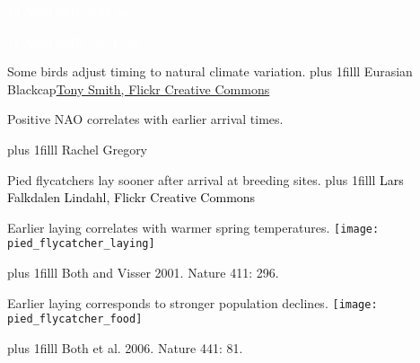 \documentclass[t]{beamer}
\newcommand\imagecredit[1]{%
	\vskip0pt plus 1filll \tiny #1}%
\begin{document}
{
\begin{frame}[t,plain]{\textcolor{white}{10 April 2015, 3:11 am.}}
\end{frame}
}

{
\begin{frame}[t,plain]{\textcolor{white}{11 April 2015, 10:21 pm}}

\end{frame}
}


{
\begin{frame}[t,plain]{Some birds adjust timing to natural climate variation.}
	\imagecredit{Eurasian Blackcap\hfill \href{https://www.flickr.com/photos/pc_plod/7145668109/}{Tony Smith, Flickr Creative Commons}}
\end{frame}
}


{
\begin{frame}[t,plain]{Positive NAO correlates with earlier arrival times.}

	\imagecredit{\hfill Rachel Gregory}
\end{frame}
}



{
\begin{frame}[t,plain]{Pied flycatchers lay sooner after arrival at breeding sites.}
	\imagecredit{\textcolor{black}{Lars Falkdalen Lindahl, Flickr Creative Commons}}
\end{frame}
}

{
\begin{frame}[t,plain]{Earlier laying correlates with warmer spring temperatures.}
	\texttt{[image: pied\_flycatcher\_laying]}

	\imagecredit{\hfill Both and Visser 2001. Nature 411: 296.}
\end{frame}
}

{
\begin{frame}[t,plain]{Earlier laying corresponds to stronger population declines.}
	\texttt{[image: pied\_flycatcher\_food]}

	\imagecredit{\hfill Both et al. 2006. Nature 441: 81.}
\end{frame}
}
\end{document}
